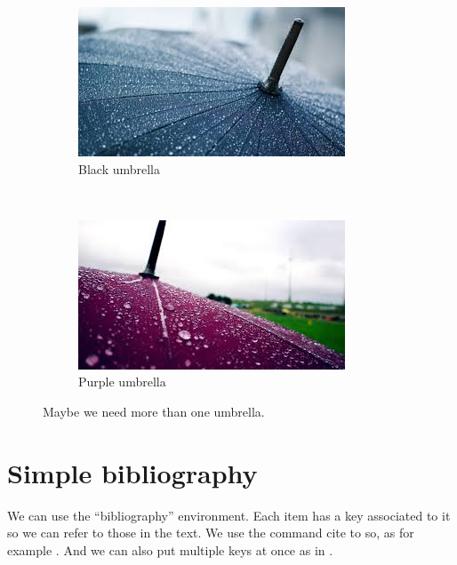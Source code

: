 \documentclass[11pt]{article}    %
\begin{document}
\begin{figure}
    \centering
    \begin{subfigure}[b]{0.3\textwidth}
        \includegraphics[width=\textwidth]{rainy}
        \caption{Black umbrella}
        \label{black}
    \end{subfigure}
    ~ %
    \begin{subfigure}[b]{0.3\textwidth}
        \includegraphics[width=\textwidth]{rainypurple}
        \caption{Purple umbrella}
        \label{purple}
    \end{subfigure}
     \caption{Maybe we need more than one umbrella.}
     \label{two umbrellas}
\end{figure}


\section{Simple bibliography}

We can use the ``bibliography'' environment. Each item has a key associated to it so we can refer to those in the text. We use the command
cite to so, as for example \cite{les85}. And we can also put multiple keys at once as in \cite{don89,rondon89}.
\end{document}
